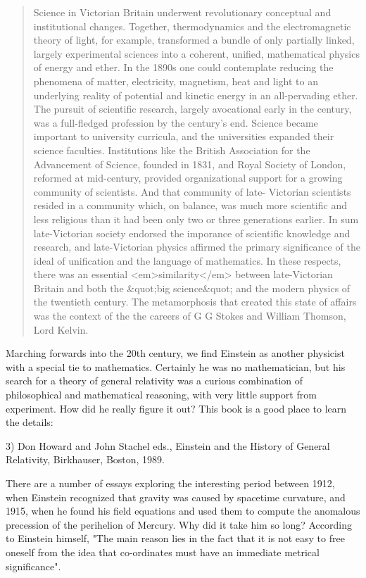 \begin{quote}
     Science in Victorian Britain underwent revolutionary conceptual
     and institutional changes.  Together, thermodynamics and the 
     electromagnetic theory of light, for example, transformed a bundle
     of only partially linked, largely experimental sciences into a 
     coherent, unified, mathematical physics of energy and ether.  In
     the 1890s one could contemplate reducing the phenomena of matter,
     electricity, magnetism, heat and light to an underlying reality of
     potential and kinetic energy in an all-pervading ether.  The pursuit
     of scientific research, largely avocational early in the century, 
     was a full-fledged profession by the century's end.  Science became
     important to university curricula, and the universities expanded
     their science faculties.  Institutions like the British Association
     for the Advancement of Science, founded in 1831, and Royal Society
     of London, reformed at mid-century, provided organizational support
     for a growing community of scientists.  And that community of late-
     Victorian scientists resided in a community which, on balance, was
     much more scientific and less religious than it had been only two
     or three generations earlier.  In sum late-Victorian society 
     endorsed the imporance of scientific knowledge and research, and
     late-Victorian physics affirmed the primary significance of the 
     ideal of unification and the language of mathematics.  In these
     respects, there was an essential <em>similarity</em> between late-Victorian
     Britain and both the &quot;big science&quot; and the modern physics of the
     twentieth century.  The metamorphosis that created this state of
     affairs was the context of the the careers of G G Stokes and William
     Thomson, Lord Kelvin.
\end{quote}
    
Marching forwards into the 20th century, we find Einstein as another
physicist with a special tie to mathematics.  Certainly he was no
mathematician, but his search for a theory of general relativity was
a curious combination of philosophical and mathematical reasoning, 
with very little support from experiment.  How did he really figure
it out?  This book is a good place to learn the details:

3) Don Howard and John Stachel eds., Einstein and the History of General
Relativity, Birkhauser, Boston, 1989.  

There are a number of essays exploring the interesting period between
1912, when Einstein recognized that gravity was caused by spacetime
curvature, and 1915, when he found his field equations and used them to
compute the anomalous precession of the perihelion of Mercury.  Why did
it take him so long?  According to Einstein himself, "The main reason
lies in the fact that it is not easy to free oneself from the idea that
co-ordinates must have an immediate metrical significance". 

